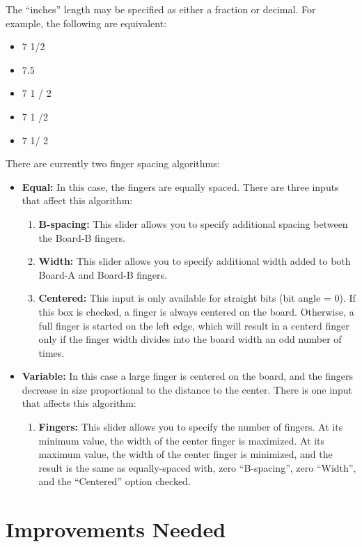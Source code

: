 \documentclass[12pt,final]{article}
\begin{document}
The ``inches'' length may be specified as either a fraction or decimal.  For example,
the following are equivalent:
\begin{itemize}
\item 7 1/2
\item 7.5
\item 7 1 / 2
\item 7 1 /2
\item 7 1/ 2
\end{itemize}
There are currently two finger spacing algorithms:
\begin{itemize}
\item \textbf{Equal:} In this case, the fingers are equally spaced.
  There are three inputs that affect this algorithm:
  \begin{enumerate}
  \item \textbf{B-spacing:} This slider allows you to specify additional spacing between
    the Board-B fingers.
  \item \textbf{Width:} This slider allows you to specify additional width added
    to both Board-A and Board-B fingers.
  \item \textbf{Centered:} This input is only available for straight bits (bit
    angle = 0).  If this box is checked, a finger is always centered on
    the board.  Otherwise, a full finger is started on the left edge, which
    will result in a centerd finger only if the finger width divides into the
    board width an odd number of times.
  \end{enumerate}
\item \textbf{Variable:} In this case a large finger is centered on the board,
  and the fingers decrease in size proportional to the distance to the center.
  There is one input that affects this algorithm:
  \begin{enumerate}
  \item \textbf{Fingers:} This slider allows you to specify the number of
    fingers.  At its minimum value, the width of the center finger is maximized. At
    its maximum value, the width of the center finger is minimized, and the result is
    the same as equally-spaced with, zero ``B-spacing'', zero ``Width'', and
    the ``Centered'' option checked.
  \end{enumerate}
\end{itemize}

\section{Improvements Needed}
\end{document}
